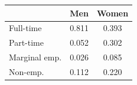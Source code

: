 \begin{tabular}{lcc}
\hline 
 & {Men} & {Women}\tabularnewline
\hline 
Full-time & 0.811 & 0.393 \tabularnewline
Part-time & 0.052 &  0.302 \tabularnewline
Marginal emp. & 0.026 &  0.085\tabularnewline
Non-emp. & 0.112 &  0.220 \tabularnewline
\hline 
\end{tabular}
